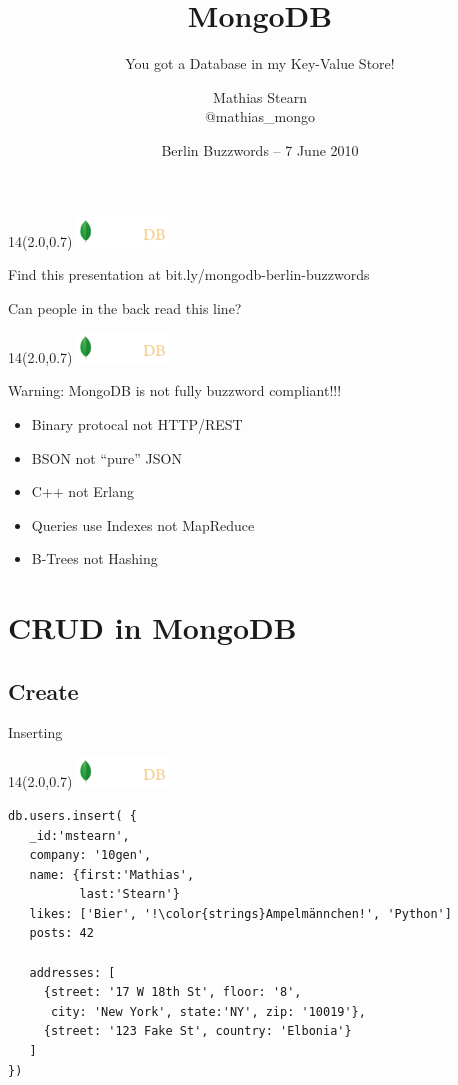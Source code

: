 \documentclass{beamer}
\title{MongoDB}
\subtitle{You got a Database in my Key-Value Store!}
\author{Mathias Stearn \\ @mathias\_mongo}
\institute{ \includegraphics[height=0.8cm]{10gen.png} }
\date{Berlin Buzzwords -- 7 June 2010}
\newcommand{\MongoLogo}{
\begin{textblock}{14}(2.0,0.7)
  \includegraphics[height=0.8cm]{logo-mongodb-ondark.png}
\end{textblock}
}
\begin{document}
\begin{frame}
  \MongoLogo
  \titlepage
  
  \begin{center}
    Find this presentation at bit.ly/mongodb-berlin-buzzwords

    \small Can people in the back read this line?
  \end{center}
\end{frame}


\begin{frame}
  \MongoLogo

  \begin{block}{ {\color{red} Warning:} MongoDB is not fully buzzword compliant!!!}
    \begin{itemize}
      \item Binary protocal not HTTP/REST
      \item BSON not ``pure'' JSON
      \item C++ not Erlang
      \item Queries use Indexes not MapReduce
      \item B-Trees not Hashing
    \end{itemize}
    
  \end{block}

\end{frame}

\section{CRUD in MongoDB}

\subsection{Create}
\begin{frame}[fragile]{Inserting}
  \MongoLogo

\begin{lstlisting}
db.users.insert( {
   _id:'mstearn',
   company: '10gen',
   name: {first:'Mathias',
          last:'Stearn'}
   likes: ['Bier', '!\color{strings}Ampelmännchen!', 'Python']
   posts: 42

   addresses: [
     {street: '17 W 18th St', floor: '8',
      city: 'New York', state:'NY', zip: '10019'},
     {street: '123 Fake St', country: 'Elbonia'}
   ]
})
\end{lstlisting}
\end{frame}
\end{document}
